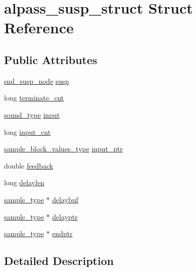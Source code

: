 \hypertarget{structalpass__susp__struct}{}\section{alpass\+\_\+susp\+\_\+struct Struct Reference}
\label{structalpass__susp__struct}
\subsection*{Public Attributes}
\begin{DoxyCompactItemize}
\item 
\hyperlink{sound_8h_a6b268203688a934bd798ceb55f85d4c0}{snd\+\_\+susp\+\_\+node} \hyperlink{structalpass__susp__struct_a06e9fdfd660f90af3be1251ed825cd0f}{susp}
\item 
long \hyperlink{structalpass__susp__struct_a9b6b64717fd6a54f5dd04e9a5afeb874}{terminate\+\_\+cnt}
\item 
\hyperlink{sound_8h_a792cec4ed9d6d636d342d9365ba265ea}{sound\+\_\+type} \hyperlink{structalpass__susp__struct_a3913fd64f64ed2ce47341733af0fc982}{input}
\item 
long \hyperlink{structalpass__susp__struct_a4d723d11e173b6a0afcead1d3389f87c}{input\+\_\+cnt}
\item 
\hyperlink{sound_8h_a83d17f7b465d1591f27cd28fc5eb8a03}{sample\+\_\+block\+\_\+values\+\_\+type} \hyperlink{structalpass__susp__struct_a870bd68b4996dfcefd184938668ca7fc}{input\+\_\+ptr}
\item 
double \hyperlink{structalpass__susp__struct_aaafec462fbd800fd415e4322973dc351}{feedback}
\item 
long \hyperlink{structalpass__susp__struct_ae822218ae7665a464671e161c64dfa44}{delaylen}
\item 
\hyperlink{sound_8h_a3a9d1d4a1c153390d2401a6e9f71b32c}{sample\+\_\+type} $\ast$ \hyperlink{structalpass__susp__struct_a062b32e9434c380c59c8390e490c990a}{delaybuf}
\item 
\hyperlink{sound_8h_a3a9d1d4a1c153390d2401a6e9f71b32c}{sample\+\_\+type} $\ast$ \hyperlink{structalpass__susp__struct_a938e876b63e4eb5fe774500caac8e6b8}{delayptr}
\item 
\hyperlink{sound_8h_a3a9d1d4a1c153390d2401a6e9f71b32c}{sample\+\_\+type} $\ast$ \hyperlink{structalpass__susp__struct_a9c4a8987b95eae754cb3726cce88c1bf}{endptr}
\end{DoxyCompactItemize}


\subsection{Detailed Description}


